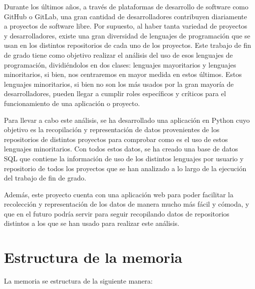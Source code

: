 \documentclass[a4paper, 12pt]{book}
\begin{document}
Durante los últimos años, a través de plataformas de desarrollo de software como GitHub o GitLab, una gran cantidad de desarrolladores contribuyen diariamente a proyectos de software libre. Por supuesto, al haber tanta variedad de proyectos y desarrolladores, existe una gran diversidad de lenguajes de programación que se usan en los distintos repositorios de cada uno de los proyectos. Este trabajo de fin de grado tiene como objetivo realizar el análisis del uso de esos lenguajes de programación, dividiéndolos en dos clases: lenguajes mayoritarios y lenguajes minoritarios, si bien, nos centraremos en mayor medida en estos últimos. Estos lenguajes minoritarios, si bien no son los más usados por la gran mayoría de desarrolladores, pueden llegar a cumplir roles específicos y críticos para el funcionamiento de una aplicación o proyecto.

Para llevar a cabo este análisis, se ha desarrollado una aplicación en Python cuyo objetivo es la recopilación y representación de datos provenientes de los repositorios de distintos proyectos para comprobar como es el uso de estos lenguajes minoritarios. Con todos estos datos, se ha creado una base de datos SQL que contiene la información de uso de los distintos lenguajes por usuario y repositorio de todos los proyectos que se han analizado a lo largo de la ejecución del trabajo de fin de grado.

Además, este proyecto cuenta con una aplicación web para poder facilitar la recolección y representación de los datos de manera mucho más fácil y cómoda, y que en el futuro podría servir para seguir recopilando datos de repositorios distintos a los que se han usado para realizar este análisis.

\section{Estructura de la memoria}
\label{sec:estructura}

La memoria se estructura de la siguiente manera:
\end{document}
